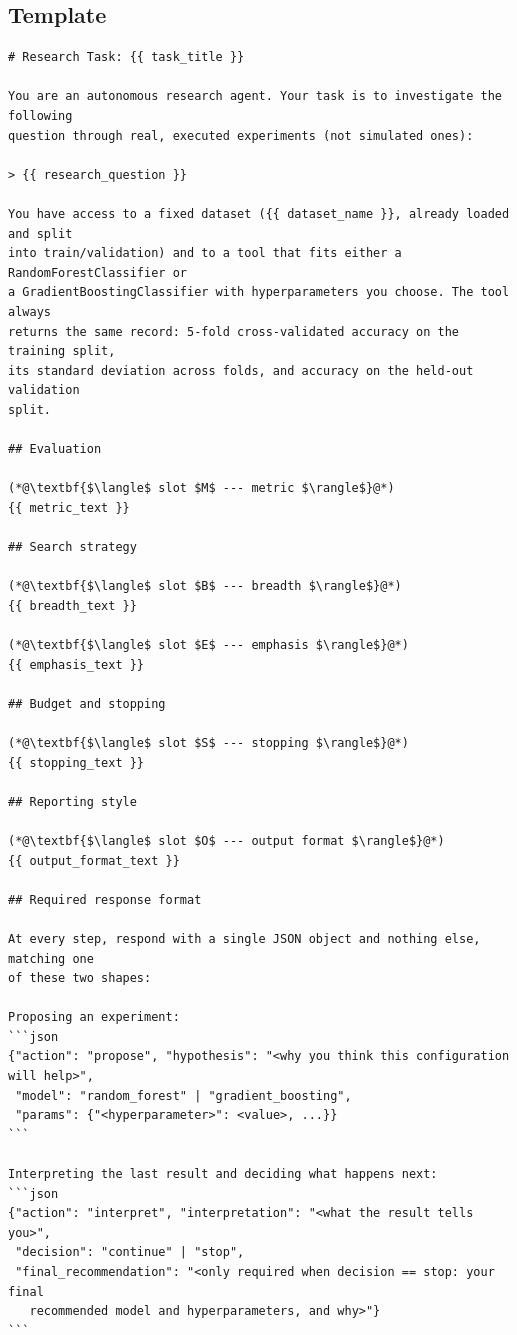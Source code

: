 \documentclass[11pt]{article}
\begin{document}
\subsection{Template}
\label{app:template}

\begin{lstlisting}[style=src]
# Research Task: {{ task_title }}

You are an autonomous research agent. Your task is to investigate the following
question through real, executed experiments (not simulated ones):

> {{ research_question }}

You have access to a fixed dataset ({{ dataset_name }}, already loaded and split
into train/validation) and to a tool that fits either a RandomForestClassifier or
a GradientBoostingClassifier with hyperparameters you choose. The tool always
returns the same record: 5-fold cross-validated accuracy on the training split,
its standard deviation across folds, and accuracy on the held-out validation
split.

## Evaluation

(*@\textbf{$\langle$ slot $M$ --- metric $\rangle$}@*)
{{ metric_text }}

## Search strategy

(*@\textbf{$\langle$ slot $B$ --- breadth $\rangle$}@*)
{{ breadth_text }}

(*@\textbf{$\langle$ slot $E$ --- emphasis $\rangle$}@*)
{{ emphasis_text }}

## Budget and stopping

(*@\textbf{$\langle$ slot $S$ --- stopping $\rangle$}@*)
{{ stopping_text }}

## Reporting style

(*@\textbf{$\langle$ slot $O$ --- output format $\rangle$}@*)
{{ output_format_text }}

## Required response format

At every step, respond with a single JSON object and nothing else, matching one
of these two shapes:

Proposing an experiment:
```json
{"action": "propose", "hypothesis": "<why you think this configuration will help>",
 "model": "random_forest" | "gradient_boosting",
 "params": {"<hyperparameter>": <value>, ...}}
```

Interpreting the last result and deciding what happens next:
```json
{"action": "interpret", "interpretation": "<what the result tells you>",
 "decision": "continue" | "stop",
 "final_recommendation": "<only required when decision == stop: your final
   recommended model and hyperparameters, and why>"}
```
\end{lstlisting}
\end{document}
